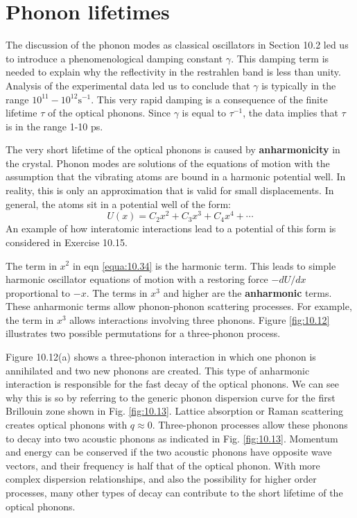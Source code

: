 \documentclass[12pt]{book}
\begin{document}
{\section{Phonon lifetimes}
The discussion of the phonon modes as classical oscillators in Section 10.2 led us to introduce a phenomenological damping constant $\gamma$. This damping term is needed to explain why the reflectivity in the restrahlen band is less than unity. Analysis of the experimental data led us to conclude that $\gamma$ is typically in the range $10^{11} -10^{12}\mathrm{s^{-1}}$. This very rapid damping is a consequence of the finite lifetime $\tau$ of the optical phonons. Since $\gamma$ is equal to $\tau^{-1}$, the data implies that $\tau$ is in the range 1-10 ps.


The very short lifetime of the optical phonons is caused by \textbf{anharmonicity} in the crystal. Phonon modes are solutions of the equations of motion with the assumption that the vibrating atoms are bound in a harmonic potential well. In reality, this is only an approximation that is valid for small displacements. In general, the atoms sit in a potential well of the form:
\begin{equation}\label{equa:10.34}
  U(x)=C_2x^2+C_3x^3+C_4x^4+\cdots
\end{equation}
An example of how interatomic interactions lead to a potential of this form is considered in Exercise 10.15.

The term in $x^2$ in eqn \ref{equa:10.34} is the harmonic term. This leads to simple harmonic oscillator equations of motion with a restoring force $-dU /dx$ proportional to $-x$. The terms in $x^3$ and higher are the \textbf{anharmonic} terms. These anharmonic terms allow phonon-phonon scattering processes. For example, the term in $x^3$ allows interactions involving three phonons. Figure \ref{fig:10.12} illustrates two possible permutations for a three-phonon process.

Figure 10.12(a) shows a three-phonon interaction in which one phonon is annihilated and two new phonons are created. This type of anharmonic interaction is responsible for the fast decay of the optical phonons. We can see why this is so by referring to the generic phonon dispersion curve for the first Brillouin zone shown in Fig. \ref{fig:10.13}. Lattice absorption or Raman scattering creates optical phonons with $q\approx0$. Three-phonon processes allow these phonons to decay into two acoustic phonons as indicated in Fig. \ref{fig:10.13}. Momentum and energy can be conserved if the two acoustic phonons have opposite wave vectors, and their frequency is half that of the optical phonon. With more complex dispersion relationships, and also the possibility for higher order processes, many other types of decay can contribute to the short lifetime of the optical phonons.

}
\end{document}
